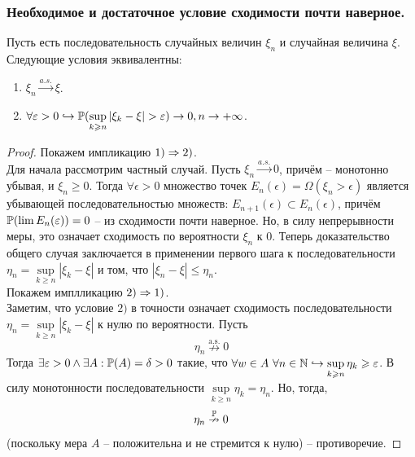 \subsubsection{Необходимое и достаточное условие сходимости почти наверное.}
\begin{theorem}
    Пусть есть последовательность случайных величин $\xi_n$ и случайная величина $\xi$.
    Следующие условия эквивалентны:
    \begin{enumerate}
        \item $\xi_n \xrightarrow{a.s.} \xi$.
        \item $\forall \epsilon > 0 \hookrightarrow \P(\sup\limits_{k \geq n} |\xi_k - \xi| > \epsilon) \ra 0, n \ra +\infty$.
    \end{enumerate}
\end{theorem}
\begin{proof}
    Покажем импликацию $1) \Ra 2)$. \\
    Для начала рассмотрим частный случай. Пусть $\xi_n \xrightarrow{a.s.} 0$, причём -- монотонно убывая, и $\xi_n \geq 0$. Тогда $\forall \epsilon > 0$ множество точек $E_n(\epsilon) = \Omega(\xi_n > \epsilon)$ является убывающей последовательностью множеств: $E_{n + 1}(\epsilon) \subset E_{n}(\epsilon)$, причём $\P(\lim E_n(\epsilon)) = 0$ -- из сходимости почти наверное. Но, в силу непрерывности меры, это означает сходимость по вероятности $\xi_n$ к 0.
    Теперь доказательство общего случая заключается в применении первого шага к последовательности $\eta_n = \sup\limits_{k \geq n}|\xi_k - \xi|$ и том, что $|\xi_n - \xi| \leq \eta_n$. \\
    Покажем имплликацию $2) \Ra 1)$. \\
    Заметим, что условие $2)$ в точности означает сходимость последовательности $\eta_n = \sup\limits_{k \geq n}|\xi_k - \xi|$ к нулю по вероятности.
    Пусть \[\eta_n \overset{\text{a.s.}}{\nrightarrow} 0\]
    Тогда $\exists \epsilon > 0 \wedge \exists A: \P(A) = \delta > 0$ такие, что $\forall w \in A \ \forall n \in \N \hookrightarrow \sup\limits_{k \geq n} \eta_k \geq \epsilon$.
    В силу монотонности последовательности $\sup\limits_{k \geq n} \eta_k = \eta_n$.
    Но, тогда, \[\eta_n \overset{\P}{\nrightarrow} 0\] (поскольку мера $A$ -- положительна и не стремится к нулю) -- противоречие.
\end{proof}
